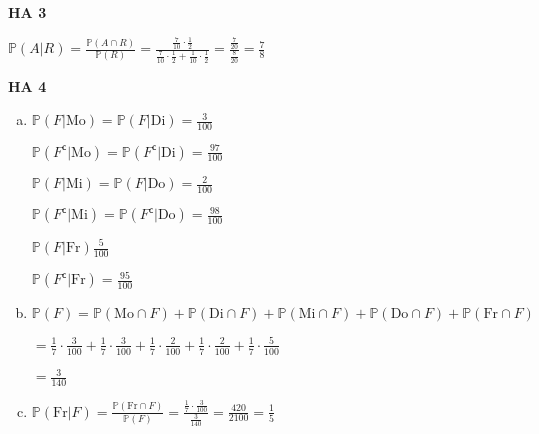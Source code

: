 \documentclass[a4paper,12pt]{article}
\newcommand{\Aufgabe}[1]{
        {
        \vspace*{0.5cm}
        \textbf{HA #1}
        \vspace*{0.2cm}
    }
}
\begin{document}
    \Aufgabe{3}

    $ \displaystyle \mathbb{P}(A | R) = \frac{\mathbb{P}(A \cap R)}{\mathbb{P}(R)} = \frac{\frac{7}{10} \cdot \frac{1}{2}}{\frac{7}{10} \cdot \frac{1}{2} + \frac{1}{10} \cdot \frac{1}{2}} = \frac{\frac{7}{20}}{\frac{8}{20}} = \frac{7}{8} $

    \newpage 
    
    \Aufgabe{4}
    \begin{enumerate}[(a)]
        \item

        $ \displaystyle \mathbb{P}(F | \text{Mo}) = \mathbb{P}(F | \text{Di}) = \frac{3}{100} $

        $ \displaystyle \mathbb{P}(F^{\mathsf{c}} | \text{Mo}) = \mathbb{P}(F^{\mathsf{c}} | \text{Di}) = \frac{97}{100} $

        $ \displaystyle \mathbb{P}(F | \text{Mi}) = \mathbb{P}(F | \text{Do}) = \frac{2}{100} $

        $ \displaystyle \mathbb{P}(F^{\mathsf{c}} | \text{Mi}) = \mathbb{P}(F^{\mathsf{c}} | \text{Do}) = \frac{98}{100} $

        $ \displaystyle \mathbb{P}(F | \text{Fr}) \frac{5}{100} $

        $ \displaystyle \mathbb{P}(F^{\mathsf{c}} | \text{Fr}) = \frac{95}{100} $

        \item

        $ \displaystyle\mathbb{P}(F) = \mathbb{P}(\text{Mo} \cap F) + \mathbb{P}(\text{Di} \cap F) + \mathbb{P}(\text{Mi} \cap F) + \mathbb{P}(\text{Do} \cap F) + \mathbb{P}(\text{Fr} \cap F)  $
        
        $ \displaystyle = \frac{1}{7} \cdot \frac{3}{100} + \frac{1}{7} \cdot \frac{3}{100} + \frac{1}{7} \cdot \frac{2}{100} + \frac{1}{7} \cdot \frac{2}{100} + \frac{1}{7} \cdot \frac{5}{100} $

        $ \displaystyle = \frac{3}{140} $

        \item

        $ \displaystyle \mathbb{P}(\text{Fr} | F) = \frac{\mathbb{P}(\text{Fr} \cap F)}{\mathbb{P}(F)} = \frac{\frac{1}{7} \cdot \frac{3}{100}}{\frac{3}{140}} = \frac{420}{2100} = \frac{1}{5} $
    \end{enumerate}
\end{document}
